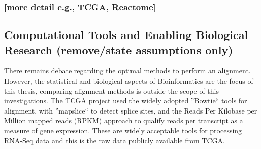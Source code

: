 \subsubsection{[more detail e.g., TCGA, Reactome]}
\subsection{Computational Tools and Enabling Biological Research (remove/state assumptions only)}

There remains debate regarding the optimal methods to perform an alignment. However, the statistical and biological aspects of Bioinformatics are the focus of this thesis, comparing alignment methods is outside the scope of this investigations. The TCGA project used the widely adopted ''Bowtie`` tools for alignment, with ''mapslice`` to detect splice sites, and the Reads Per Kilobase per Million mapped reads (RPKM) approach to qualify reads per transcript as a measure of gene expression. These are widely acceptable tools for processing RNA-Seq data and this is the raw data publicly available from TCGA.


